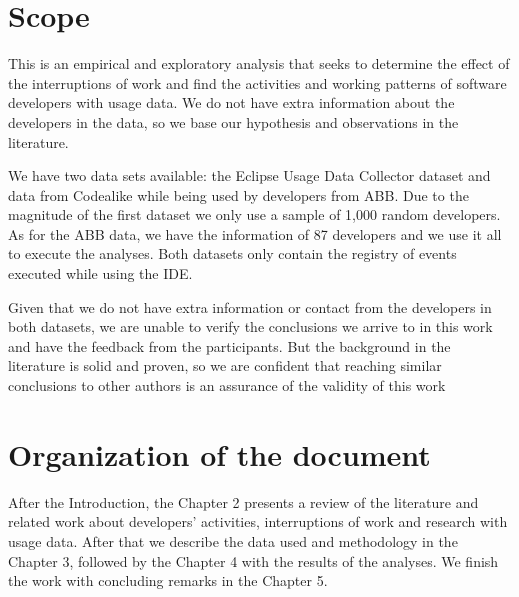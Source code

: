 \section{Scope}
This is an empirical and exploratory analysis that seeks to determine the effect of the interruptions of work and find the activities and working patterns of software developers with usage data. We do not have extra information about the developers in the data, so we base our hypothesis and observations in the literature. 

We have two data sets available: the Eclipse Usage Data Collector dataset and data from Codealike while being used by developers from ABB. Due to the magnitude of the first dataset we only use a sample of 1,000 random developers. As for the ABB data, we have the information of 87 developers and we use it all to execute the analyses. Both datasets only contain the registry of events executed while using the IDE.

Given that we do not have extra information or contact from the developers in both datasets, we are unable to verify the conclusions we arrive to in this work and have the feedback from the participants. But the background in the literature is solid and proven, so we are confident that reaching similar conclusions to other authors is an assurance of the validity of this work

\section{Organization of the document}

After the Introduction, the Chapter 2 presents a review of the literature and related work about developers' activities, interruptions of work and research with usage data. After that we describe the data used and methodology in the Chapter 3, followed by the Chapter 4 with the results of the analyses. We finish the work with concluding remarks in the Chapter 5.
